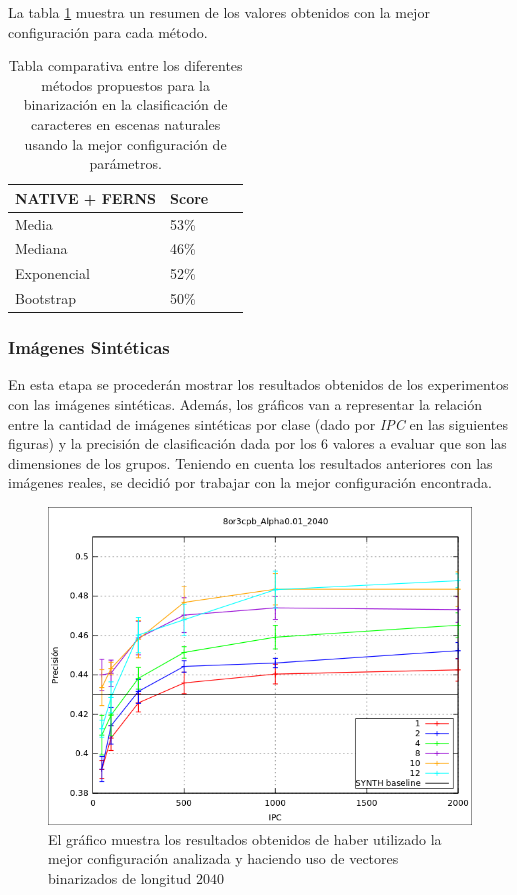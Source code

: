 	La tabla \ref{table: reales-comparativa} muestra un resumen de los valores obtenidos con la mejor configuración para cada método.
	
	\begin{table}
		\centering
		\begin{tabular}{ | l | l | l | p{5cm} |}
    			\hline
    				\textbf{NATIVE + FERNS} & \textbf{Score} \\ \hline
    				Media & 53\% \\ \hline
    				Mediana & 46\%\\ \hline
    				Exponencial & 52\% \\ \hline
    				Bootstrap & 50\%\\ 
    			\hline
    		\end{tabular}
    		\caption[Resultados imagenes naturales]{Tabla comparativa entre los diferentes métodos propuestos para la binarización en la clasificación de caracteres en escenas naturales usando la mejor configuración de parámetros.}
    		\label{table: reales-comparativa}
    	\end{table}
    	
    	
    	\newpage
    	\subsubsection{Imágenes Sintéticas}
    	
    En esta etapa se procederán mostrar los resultados obtenidos de los experimentos con las imágenes sintéticas. Además, los gráficos van a representar la relación entre la cantidad de imágenes sintéticas por clase (dado por \textit{IPC} en las siguientes figuras) y la precisión de clasificación dada por los $6$ valores a evaluar que son las dimensiones de los grupos. Teniendo en cuenta los resultados anteriores con las imágenes reales, se decidió por trabajar con la mejor configuración encontrada.
  
			\begin{figure}[htbp]
				\centering
				\includegraphics[scale=0.6]{img/resultados/sinteticas/mean_2040.png}
				\caption[Sintéticas media 2040]{El gráfico muestra los resultados obtenidos de haber utilizado la mejor configuración analizada y haciendo uso de vectores binarizados de longitud $2040$}
				\label{fig: Sinteticas-media-2040}
			\end{figure}
	

